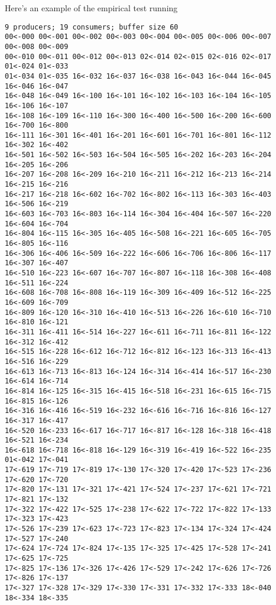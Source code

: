\documentclass{concdistfoils}
\begin{document}
\begin{slide}
\begin{itemize}
\begin{class}{}
  } // main
} //example7
\end{class}
\end{itemize}
\begin{note}
Here's an example of the empirical test running
\begin{verbatim}
9 producers; 19 consumers; buffer size 60
00<-000 00<-001 00<-002 00<-003 00<-004 00<-005 00<-006 00<-007 00<-008 00<-009
00<-010 00<-011 00<-012 00<-013 02<-014 02<-015 02<-016 02<-017 01<-024 01<-033
01<-034 01<-035 16<-032 16<-037 16<-038 16<-043 16<-044 16<-045 16<-046 16<-047
16<-048 16<-049 16<-100 16<-101 16<-102 16<-103 16<-104 16<-105 16<-106 16<-107
16<-108 16<-109 16<-110 16<-300 16<-400 16<-500 16<-200 16<-600 16<-700 16<-800
16<-111 16<-301 16<-401 16<-201 16<-601 16<-701 16<-801 16<-112 16<-302 16<-402
16<-501 16<-502 16<-503 16<-504 16<-505 16<-202 16<-203 16<-204 16<-205 16<-206
16<-207 16<-208 16<-209 16<-210 16<-211 16<-212 16<-213 16<-214 16<-215 16<-216
16<-217 16<-218 16<-602 16<-702 16<-802 16<-113 16<-303 16<-403 16<-506 16<-219
16<-603 16<-703 16<-803 16<-114 16<-304 16<-404 16<-507 16<-220 16<-604 16<-704
16<-804 16<-115 16<-305 16<-405 16<-508 16<-221 16<-605 16<-705 16<-805 16<-116
16<-306 16<-406 16<-509 16<-222 16<-606 16<-706 16<-806 16<-117 16<-307 16<-407
16<-510 16<-223 16<-607 16<-707 16<-807 16<-118 16<-308 16<-408 16<-511 16<-224
16<-608 16<-708 16<-808 16<-119 16<-309 16<-409 16<-512 16<-225 16<-609 16<-709
16<-809 16<-120 16<-310 16<-410 16<-513 16<-226 16<-610 16<-710 16<-810 16<-121
16<-311 16<-411 16<-514 16<-227 16<-611 16<-711 16<-811 16<-122 16<-312 16<-412
16<-515 16<-228 16<-612 16<-712 16<-812 16<-123 16<-313 16<-413 16<-516 16<-229
16<-613 16<-713 16<-813 16<-124 16<-314 16<-414 16<-517 16<-230 16<-614 16<-714
16<-814 16<-125 16<-315 16<-415 16<-518 16<-231 16<-615 16<-715 16<-815 16<-126
16<-316 16<-416 16<-519 16<-232 16<-616 16<-716 16<-816 16<-127 16<-317 16<-417
16<-520 16<-233 16<-617 16<-717 16<-817 16<-128 16<-318 16<-418 16<-521 16<-234
16<-618 16<-718 16<-818 16<-129 16<-319 16<-419 16<-522 16<-235 01<-042 17<-041
17<-619 17<-719 17<-819 17<-130 17<-320 17<-420 17<-523 17<-236 17<-620 17<-720
17<-820 17<-131 17<-321 17<-421 17<-524 17<-237 17<-621 17<-721 17<-821 17<-132
17<-322 17<-422 17<-525 17<-238 17<-622 17<-722 17<-822 17<-133 17<-323 17<-423
17<-526 17<-239 17<-623 17<-723 17<-823 17<-134 17<-324 17<-424 17<-527 17<-240
17<-624 17<-724 17<-824 17<-135 17<-325 17<-425 17<-528 17<-241 17<-625 17<-725
17<-825 17<-136 17<-326 17<-426 17<-529 17<-242 17<-626 17<-726 17<-826 17<-137
17<-327 17<-328 17<-329 17<-330 17<-331 17<-332 17<-333 18<-040 18<-334 18<-335

\end{verbatim}
\end{note}
\end{slide}
\end{document}
